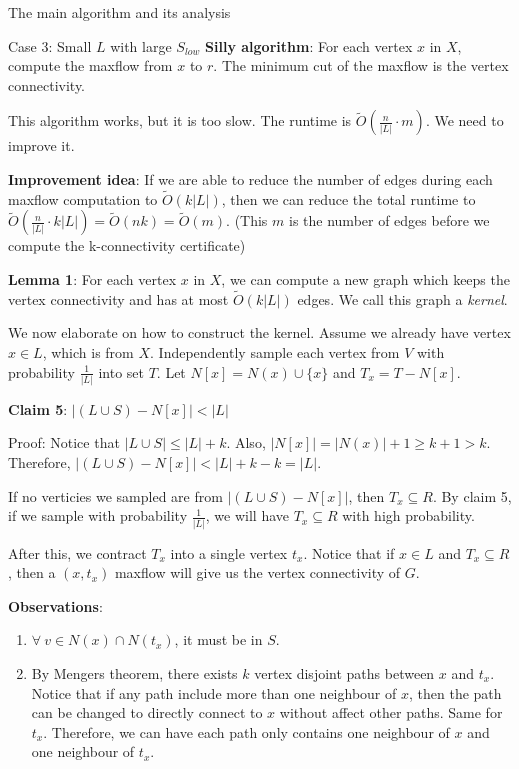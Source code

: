 \documentclass{article}
\begin{document}
\begin{section}{The main algorithm and its analysis}
\begin{subsection}{Case 3: Small $L$ with large $S_{low}$}
    \textbf{Silly algorithm}: For each vertex $x$ in $X$, compute the maxflow from $x$ to $r$. The minimum cut of the maxflow is the vertex connectivity.

    This algorithm works, but it is too slow. The runtime is $\tilde{O}(\frac{n}{|L|} \cdot m)$. We need to improve it.

    \textbf{Improvement idea}: If we are able to reduce the number of edges during each maxflow computation to $\tilde{O}(k|L|)$, then we can reduce the total runtime to $\tilde{O}(\frac{n}{|L|} \cdot k|L|) = \tilde{O}(nk) = \tilde{O}(m)$. (This $m$ is the number of edges before we compute the k-connectivity certificate)

    \textbf{Lemma 1}: For each vertex $x$ in $X$, we can compute a new graph which keeps the vertex connectivity and has at most $\tilde{O}(k|L|)$ edges. We call this graph a \textit{kernel}. 

    We now elaborate on how to construct the kernel. Assume we already have vertex $x \in L$, which is from $X$. Independently sample each vertex from $V$ with probability $\frac{1}{|L|}$ into set $T$. Let $N[x] = N(x) \cup \{x\}$ and $T_x = T - N[x]$.

    \textbf{Claim 5}: $|(L \cup S) - N[x]| < |L|$

    Proof: Notice that $|L \cup S| \leq |L| + k$. Also, $|N[x]| = |N(x)| + 1 \geq k + 1 > k$. Therefore, $|(L \cup S) - N[x]| < |L| + k - k = |L|$.
    
    If no verticies we sampled are from $|(L \cup S) - N[x]|$, then $T_x \subseteq R$. By claim 5, if we sample with probability $\frac{1}{|L|}$, we will have $T_x \subseteq R$ with high probability.

    After this, we contract $T_x$ into a single vertex $t_x$. Notice that if $x \in L$ and $T_x \subseteq R$, then a $(x, t_x)$ maxflow will give us the vertex connectivity of $G$. 

    \textbf{Observations}:
    \begin{enumerate}
      \item $\forall \ v \in N(x) \cap N(t_x)$, it must be in $S$. 
      \item By Mengers theorem, there exists $k$ vertex disjoint paths between $x$ and $t_x$. Notice that if any path include more than one neighbour of $x$, then the path can be changed to directly connect to $x$ without affect other paths. Same for $t_x$. Therefore, we can have each path only contains one neighbour of $x$ and one neighbour of $t_x$. 
    \end{enumerate}


\end{subsection}
\end{section}
\end{document}
